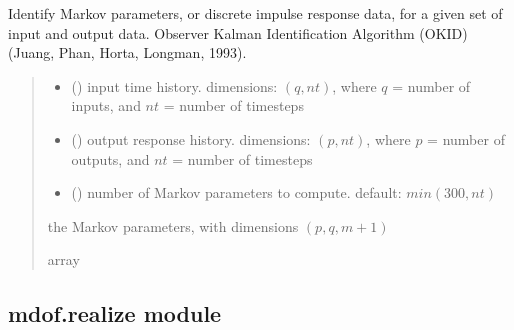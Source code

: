 \documentclass[letterpaper,10pt,english]{sphinxmanual}
\begin{document}
\begin{fulllineitems}
\label{\detokenize{library/mdof.markov:mdof.markov.okid}}
\pysigstartsignatures
{}
\pysigstopsignatures
\sphinxAtStartPar
Identify Markov parameters, or discrete impulse response data, for a given set of input and output data.
Observer Kalman Identification Algorithm (OKID) (Juang, Phan, Horta, Longman, 1993).
\begin{quote}\begin{description}
\begin{itemize}
\item {} 
\sphinxAtStartPar
{} () \textendash{} input time history. dimensions: \((q,nt)\), where
\(q\) = number of inputs, and \(nt\) = number of timesteps

\item {} 
\sphinxAtStartPar
{} () \textendash{} output response history.
dimensions: \((p,nt)\), where \(p\) = number of outputs, and
\(nt\) = number of timesteps

\item {} 
\sphinxAtStartPar
{} (\sphinxstyleliteralemphasis{\sphinxupquote{, }}) \textendash{} number of Markov parameters to compute. default: \(min(300, nt)\)

\end{itemize}

\sphinxAtStartPar
the Markov parameters, with dimensions \((p,q,m+1)\)

\sphinxAtStartPar
array

\end{description}\end{quote}

\end{fulllineitems}


\sphinxstepscope


\subsection{mdof.realize module}
\label{\detokenize{library/mdof.realize:module-mdof.realize}}\label{\detokenize{library/mdof.realize:mdof-realize-module}}\label{\detokenize{library/mdof.realize::doc}}
\end{document}
